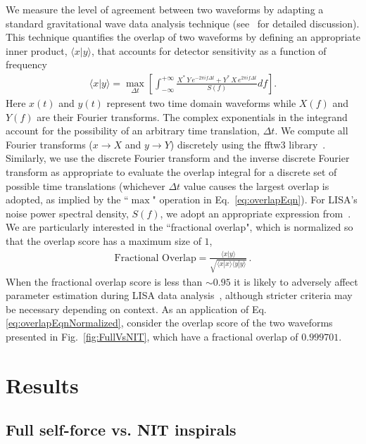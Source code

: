 \documentclass[aps,prd,twocolumn,showpacs,notitlepage,eqsecnum,
superscriptaddress,nofootinbib]{revtex4-1}
\begin{document}
We measure the level of agreement between two waveforms by adapting a standard gravitational wave data analysis technique (see~\cite{Babak_2007,Cutler_1994,Finn_1992} for detailed discussion). This technique quantifies the overlap of two waveforms by defining an appropriate inner product, $\langle x|y \rangle$, that accounts for detector sensitivity as a function of frequency
\begin{align}
    \langle x|y \rangle = \max_{\Delta t} \left[ \int_{-\infty}^{+\infty} \frac{X^{*}\,Y\,e^{-2\pi i f \Delta t} + Y^{*}\,X\,e^{2\pi i f \Delta t}}{S(f)} df \right]  . \label{eq:overlapEqn}
\end{align}
Here $x(t)$ and $y(t)$ represent two time domain waveforms while $X(f)$ and $Y(f)$ are their Fourier transforms.  The complex exponentials in the integrand account for the possibility of an arbitrary time translation, $\Delta t$. We compute all Fourier transforms ($x\rightarrow X$ and $y\rightarrow Y$) discretely using the fftw3 library~\cite{FFTW05}. Similarly, we use the discrete Fourier transform and the inverse discrete Fourier transform as appropriate to evaluate the overlap integral for a discrete set of possible time translations (whichever $\Delta t$ value causes the largest overlap is adopted, as implied by the ``$\max$" operation in Eq.~\eqref{eq:overlapEqn}). For LISA's noise power spectral density, $S(f)$, we adopt an appropriate expression from~\cite{Robson_2019}. We are particularly interested in the ``fractional overlap", which is normalized so that the overlap score has a maximum size of $1$, 
\begin{align}
    \text{Fractional Overlap} = \frac{\langle x|y \rangle}{\sqrt{\langle x|x \rangle \langle y|y \rangle}} \, . \label{eq:overlapEqnNormalized}
\end{align}
When the fractional overlap score is less than $\sim 0.95$ it is likely to adversely affect parameter estimation during LISA data analysis~\cite{Babak_2007}, although stricter criteria may be necessary depending on context. As an application of Eq. \ref{eq:overlapEqnNormalized}, consider the overlap score of the two waveforms presented in Fig.~\ref{fig:FullVsNIT}, which have a fractional overlap of $0.999701$.

\section{Results}
\label{sec:results}

\subsection{Full self-force vs. NIT inspirals}
\label{sec:FullVsNIT}
\end{document}
